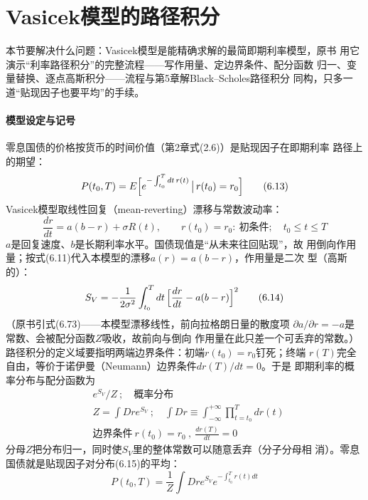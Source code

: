 \section{Vasicek模型的路径积分}

本节要解决什么问题：Vasicek模型是能精确求解的最简即期利率模型，原书
用它演示“利率路径积分”的完整流程——写作用量、定边界条件、配分函数
归一、变量替换、逐点高斯积分——流程与第5章解Black--Scholes路径积分
同构，只多一道“贴现因子也要平均”的手续。

\paragraph{模型设定与记号}
零息国债的价格按货币的时间价值（第2章式(2.6)）是贴现因子在即期利率
路径上的期望：
\begin{equation*}
P(t_0,T)=E\Bigl[e^{-\int_{t_0}^{T}dt\,r(t)}\,\big|\,r(t_0)=r_0\Bigr]
\tag{6.13}
\end{equation*}
Vasicek模型取线性回复（mean-reverting）漂移与常数波动率：
\begin{equation*}
\frac{dr}{dt}=a(b-r)+\sigma R(t),\qquad r(t_0)=r_0:\ \text{初条件};\quad t_0\leq t\leq T
\end{equation*}
$a$是回复速度、$b$是长期利率水平。国债现值是“从未来往回贴现”，故
用倒向作用量；按式(6.11)代入本模型的漂移$a(r)=a(b-r)$，作用量是二次
型（高斯的）：
\begin{equation*}
S_V=-\frac{1}{2\sigma^2}\int_{t_0}^{T}dt\,
\Bigl[\frac{dr}{dt}-a(b-r)\Bigr]^2
\tag{6.14}
\end{equation*}
（原书引式(6.73)——本模型漂移线性，前向拉格朗日量的散度项
$\partial a/\partial r=-a$是常数、会被配分函数$Z$吸收，故前向与倒向
作用量在此只差一个可丢弃的常数。）路径积分的定义域要指明两端边界条件：初端$r(t_0)=r_0$钉死；终端
$r(T)$完全自由，等价于诺伊曼（Neumann）边界条件$dr(T)/dt=0$。于是
即期利率的概率分布与配分函数为
\begin{align*}
&e^{S_V}/Z\ ;\quad\text{概率分布}\\
&Z=\int Dre^{S_V}\ ;\quad \int Dr\equiv\int_{-\infty}^{+\infty}
\prod_{t=t_0}^{T}dr(t)\\
&\text{边界条件}\ r(t_0)=r_0\ ,\ \frac{dr(T)}{dt}=0
\tag{6.15}
\end{align*}
分母$Z$把分布归一，同时使$S_V$里的整体常数可以随意丢弃（分子分母相
消）。零息国债就是贴现因子对分布(6.15)的平均：
\begin{equation*}
P(t_0,T)=\frac{1}{Z}\int Dre^{S_V}e^{-\int_{t_0}^{T}r(t)dt}
\tag{6.16}
\end{equation*}

